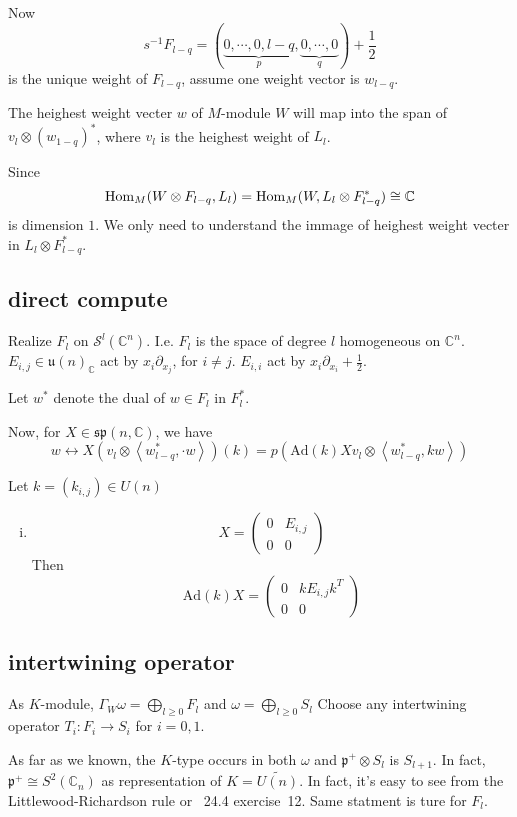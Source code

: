 \documentclass[12pt]{article}
\def\Hom{{\rm Hom}}
\def\bC{{\mathbb{C}}}
\def\pp{{\mathfrak{p}}}
\def\sS{\mathcal{S}}
\def\Ad{{\rm Ad}}
\def\inn#1#2{\left\langle{#1},{#2}\right\rangle}
\def\Ad{\mathrm{Ad}}
\def\asp{\mathfrak{sp}}
\def\fuu{\mathfrak{u}}
\begin{document}
Now 
\[
s^{-1} F_{l-q} = (\underbrace{0, \cdots, 0,l-q}_p,\underbrace{0,\cdots, 0}_q) 
+\frac{1}{2}
\]
is the unique weight of $F_{l-q}$, assume one weight vector is $w_{l-q}$.

The heighest weight vecter $w$ of $M$-module $W$ will map into the span of
$v_l\otimes(w_{1-q})^*$, where $v_l$ is the heighest weight of $L_l$. 

Since 
\[
\Hom_M(W\otimes F_{l-q},L_l)=\Hom_M(W, L_l\otimes F_{l-q}^*)\cong \bC
\]
is dimension $1$. 
We only need to understand the immage of heighest weight vecter in 
$L_l\otimes F_{l-q}^*$.

\subsection{direct compute}
Realize $F_{l}$ on $\sS^l(\bC^n)$. 
I.e. $F_{l}$ is the space of degree $l$ homogeneous on $\bC^n$.
$E_{i,j}\in \fuu(n)_\bC$ act by $x_i\partial_{x_j}$, for $i\neq j$.
$E_{i,i}$ act by $x_i\partial_{x_i}+\frac{1}{2}$.

Let $w^*$ denote the dual of $w\in F_{l}$ in $F_{l}^*$. 

Now,
for $X \in \asp(n,\bC)$,  
we have 
\[
w\leftrightarrow 
X(v_l\otimes \inn{w_{l-q}^*}{\cdot w})(k)
 = p(\Ad(k)X v_l\otimes \inn{w_{l-q}^*}{kw}) 
\]

Let $k = (k_{i,j})\in U(n)$
\begin{enumerate}[(i).]
\item 
\[
X = \begin{pmatrix} 
0 & E_{i,j}\\
0 & 0
\end{pmatrix}
\]
Then 
\[
\Ad(k) X = 
\begin{pmatrix}
0 & k E_{i,j} k^T\\
0 & 0
\end{pmatrix}
\]
\end{enumerate}

\subsection{intertwining operator}
As $K$-module, $\Gamma_W \omega = \bigoplus_{l\geq 0} F_l$ and 
$\omega = \bigoplus_{l\geq 0} S_l$
Choose any intertwining operator $T_i \colon F_i \to S_i$ for $i=0,1$. 

As far as we known, the $K$-type occurs in both $\omega$ and 
$\pp^+\otimes S_l$ is $S_{l+1}$. In fact, $\pp^+\cong S^2(\bC_n)$ 
as representation of $K=\widetilde{U(n)}$. 
In fact, it's easy to see from the Littlewood-Richardson rule or 
\cite{Humphreys1972}~24.4 exercise~12. Same statment is ture for $F_l$. 
 
\end{document}
